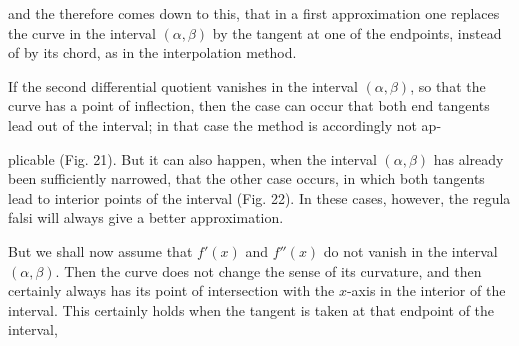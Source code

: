 
and the  therefore comes down to this,
that in a first approximation one replaces the curve in the interval
$(\alpha, \beta)$ by the tangent at one of the endpoints, instead of
by its chord, as in the interpolation method.


If the second differential quotient vanishes in the interval $(\alpha, \beta)$,
so that the curve has a point of inflection, then the case can
occur that both end tangents lead out of the interval;
in that case the  method is accordingly not ap-


plicable (Fig. 21). But it can also happen, when the interval $(\alpha, \beta)$
has already been sufficiently narrowed, that the other case occurs,
in which both tangents lead to interior points of the interval
(Fig. 22). In these cases, however, the regula
falsi will always give a better approximation.

But we shall now assume that $f'(x)$ and $f''(x)$ do not
vanish in the interval $(\alpha, \beta)$. Then the curve does not change
the sense of its curvature, and then certainly  always has its point of intersection with the
$x$-axis in the interior of the interval. This certainly holds when
the tangent is taken at that endpoint of the interval,

